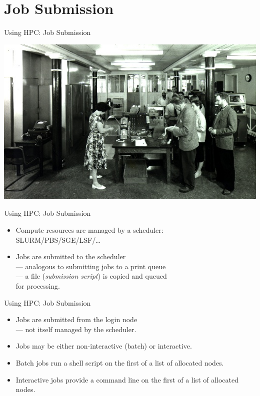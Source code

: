\section{Job Submission}
\begin{frame}{Using HPC: Job Submission}
\centerline{\includegraphics[width=1\textwidth]{imgs/EDSAC_2_1960.jpg}}
\end{frame}
\begin{frame}{Using HPC: Job Submission}
\begin{itemize}
\item{Compute resources are managed by a scheduler:\hfill\\\qquad\alert{SLURM}/PBS/SGE/LSF/\ldots}
\item{Jobs are submitted to the scheduler\hfill\\\qquad --- analogous to submitting jobs to a print queue\hfill\\\qquad --- a file (\emph{submission script}) is copied and queued\hfill\\\qquad \hphantom{---} for processing.}
\end{itemize}
\end{frame}

\begin{frame}{Using HPC: Job Submission}
\begin{itemize}
\item{Jobs are submitted from the \alert{login node}\hfill\\\qquad  --- not itself managed by the scheduler.}
\item{Jobs may be either non-interactive (\alert{batch}) or \alert{interactive}.}
\pause
\item{\alert{Batch} jobs run a shell script on the first of a list of allocated nodes.}
\item{\alert{Interactive} jobs provide a command line on the first of a list of allocated nodes.}
\end{itemize}
\end{frame}

